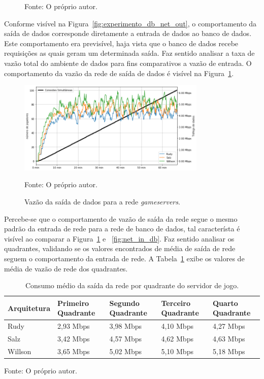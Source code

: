 \begin{figure}[htb!]
    Fonte: O próprio autor.
\end{figure}

Conforme visível na Figura~\ref{fig:experimento_db_net_out}, o comportamento da saída de dados corresponde diretamente a entrada de dados ao banco de dados.
%
Este comportamento era previsível, haja vista que o banco de dados recebe requisições as quais geram um determinada saída.
%
Faz sentido analisar a taxa de vazão total do ambiente de dados para fins comparativos a vazão de entrada.
%
O comportamento da vazão da rede de saída de dados é visível na Figura~\ref{fig:net_out_db}.

\begin{figure}[htb!]
  \caption{Vazão da saída de dados para a rede \textit{gameservers}.}
  \label{fig:net_out_db}
  \includegraphics[width=0.8\textwidth]{figuras/analise/net_out_db.png}
  \centering

  Fonte: O próprio autor.
\end{figure}

Percebe-se que o comportamento de vazão de saída da rede segue o mesmo padrão da entrada de rede para a rede de banco de dados, tal característa é visível ao comparar a Figura~\ref{fig:net_out_db} e ~\ref{fig:net_in_db}.
%
Faz sentido analisar os quadrantes, validando se os valores encontrados de média de saída de rede seguem o comportamento da entrada de rede.
%
A Tabela~\ref{tab:net_out_db_media_quadrantes} exibe os valores de média de vazão de rede dos quadrantes.

\begin{table}[htb!]
\centering
\begin{adjustbox}{max width=\textwidth}
\caption{Consumo médio da saída da rede por quadrante do servidor de jogo.}
\label{tab:net_out_db_media_quadrantes}

\begin{tabular}{l|l|l|l|l}
\hline \hline
Arquitetura & Primeiro Quadrante & Segundo Quadrante & Terceiro Quadrante & Quarto Quadrante \\ \hline \hline
Rudy        & 2,93 Mbps            & 3,98 Mbps           & 4,10 Mbps            & 4,27 Mbps          \\ \hline
Salz        & 3,42 Mbps            & 4,57 Mbps           & 4,62 Mbps            & 4,63 Mbps          \\ \hline
Willson     & 3,65 Mbps            & 5,02 Mbps          & 5,10 Mbps            & 5,18 Mbps          \\ \hline \hline
\end{tabular}
\end{adjustbox}

Fonte: O próprio autor.
\end{table}

